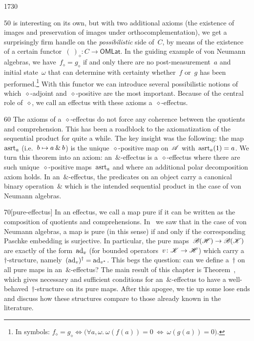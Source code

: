 \begin{parsec}{1730}
\begin{point}{50}
    is interesting on its own, but with
    two additional axioms (the existence of images and
    preservation of images under orthocomplementation),
    we get a surprisingly firm handle
    on the \emph{possibilistic} side of~$C$,
    by means of the existence
    of a certain functor~$(\ )_\diamond\colon C \to \mathsf{OMLat}$.
In the guiding example of von Neumann algebras,
    we have~$f_\diamond = g_\diamond$
        if and only
    there are no post-measurement~$a$ and initial state~$\omega$
    that can determine with certainty
    whether~$f$ or~$g$ has been performed.\footnote{%
    In symbols: $
    f_\diamond = g_\diamond \iff 
\bigl(\forall a,\omega.\  \omega(f(a))  =  0 \ \Leftrightarrow\ \omega(g(a))  =  0\bigr).$}
With this functor we can introduce several
    possibilistic notions of which~$\diamond$-adjoint
    and~$\diamond$-positive are the most important.
Because of the central role of~$\diamond$,
    we call an effectus with these axioms 
    a~$\diamond$-effectus.
\end{point}
\begin{point}{60}%
The axioms of a~$\diamond$-effectus do not force
    any coherence between the quotients and comprehension.
This has been a roadblock to the axiomatization
    of the sequential product for quite a while.
The key insight was the following:
    the map~$\mathrm{asrt}_a$ (i.e.~$b\mapsto a \mathbin{\&} b$)
    is the unique~$\diamond$-positive map on~$\mathscr{A}$
    with~$\mathrm{asrt}_a(1) = a$.
We turn this theorem into an axiom:
    an~$\&$-effectus is
    a~$\diamond$-effectus
    where there are such unique~$\diamond$-positive maps~$\mathrm{asrt}_a$
    and where an additional polar decomposition axiom holds.
In an~$\&$-effectus, the predicates on an object carry a canonical
    binary operation~$\&$
    which is the intended sequential product in
    the case of von Neumann algebras.
\end{point}
\begin{point}{70}[pure-effectus]%
In an effectus, we call a map pure if it can be written
    as the composition of quotients and comprehensions.
In~ we saw that in the case of von Neumann algebras,
    a map is pure (in this sense) if and only if the corresponding Paschke
    embedding is surjective.
In particular, the pure maps~$\mathscr{B}(\mathscr{H}) \to \mathscr{B}(\mathscr{K})$
    are exactly of the form~$\mathrm{ad}_v$
        (for bounded operators~$v\colon \mathscr{K} \to \mathscr{H}$)
    which carry a~$\dagger$-structure,
    namely~$(\mathrm{ad}_v)^\dagger = \mathrm{ad}_{v^*}$.
This begs the question: can we define a~$\dagger$ on all pure maps
    in an~$\&$-effectus?
The main result of this chapter
    is Theorem~,
    which gives  necessary and sufficient conditions
    for an~$\&$-effectus
    to have a well-behaved~$\dagger$-structure on its pure maps.
After this apogee,
    we tie up some lose ends
    and discuss how these
    structures compare to those already known in the literature.
\end{point}
\end{parsec}
